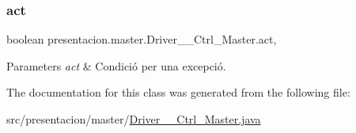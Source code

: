 \subsubsection{\texorpdfstring{act}{act}}
{\footnotesize\ttfamily boolean presentacion.\+master.\+Driver\+\_\+\+\_\+\+Ctrl\+\_\+\+Master.\+act\hspace{0.3cm}{\ttfamily [static]}, {\ttfamily [private]}}


\begin{DoxyParams}{Parameters}
{\em act} & Condició per una excepció. \\
\hline
\end{DoxyParams}


The documentation for this class was generated from the following file\+:\begin{DoxyCompactItemize}
\item 
src/presentacion/master/\hyperlink{Driver____Ctrl__Master_8java}{Driver\+\_\+\+\_\+\+Ctrl\+\_\+\+Master.\+java}\end{DoxyCompactItemize}
